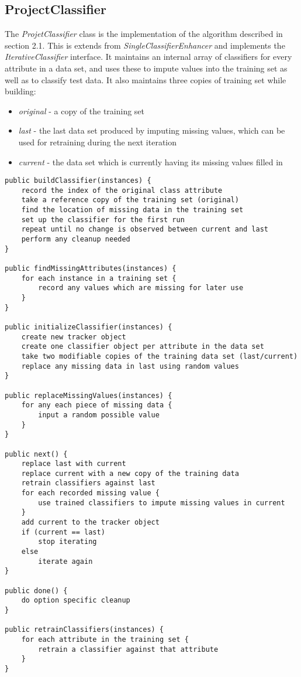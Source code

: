 \subsection{ProjectClassifier}
The \textit{ProjetClassifier} class is the implementation of the algorithm described in section 2.1. This is extends from \textit{SingleClassifierEnhancer} and implements the \textit{IterativeClassifier} interface. It maintains an internal array of classifiers for every attribute in a data set, and uses these to impute values into the training set as well as to classify test data. It also maintains three copies of training set while building:

\begin{itemize}
\item \textit{original} - a copy of the training set
\item \textit{last} - the last data set produced by imputing missing values, which can be used for retraining during the next iteration
\item \textit{current} - the data set which is currently having its missing values filled in
\end{itemize}

\begin{footnotesize}
\begin{verbatim}
public buildClassifier(instances) {
    record the index of the original class attribute
    take a reference copy of the training set (original)
    find the location of missing data in the training set
    set up the classifier for the first run
    repeat until no change is observed between current and last
    perform any cleanup needed
}

public findMissingAttributes(instances) {
    for each instance in a training set {
        record any values which are missing for later use
    }
}

public initializeClassifier(instances) {
    create new tracker object
    create one classifier object per attribute in the data set
    take two modifiable copies of the training data set (last/current)
    replace any missing data in last using random values
}

public replaceMissingValues(instances) {
    for any each piece of missing data {
        input a random possible value
    }
}

public next() {
    replace last with current
    replace current with a new copy of the training data
    retrain classifiers against last
    for each recorded missing value {
        use trained classifiers to impute missing values in current
    }
    add current to the tracker object
    if (current == last)
        stop iterating
    else   
        iterate again
}

public done() {
    do option specific cleanup
}

public retrainClassifiers(instances) {
    for each attribute in the training set {
        retrain a classifier against that attribute
    }
}
\end{verbatim}
\end{footnotesize}

